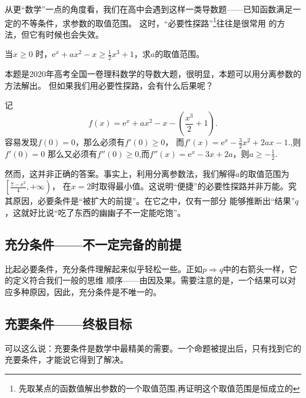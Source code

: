 从更“数学”一点的角度看，我们在高中会遇到这样一类导数题——已知函数满足一定的不等条件，求参数的取值范围。
这时，“必要性探路”\footnote{先取某点的函数值解出参数的一个取值范围,再证明这个取值范围是恒成立的}往往是很常用
的方法，但它有时候也会失效。
\begin{example}
    当$x \geqslant 0$ 时，$\mathrm{e}^x+ax^2 -x \geqslant \frac{1}{2}x^3 +1$，求$a$的取值范围。
\end{example}
\begin{solve}
    本题是2020年高考全国一卷理科数学的导数大题，很明显，本题可以用分离参数的方法解出。
    但如果我们用必要性探路，会有什么后果呢？

    记
    \[
        f(x)=\mathrm{e}^x+ax^2 -x-\left (\frac{x^3}{2} +1\right )
        .\]
    容易发现$f(0)=0$，那么必须有$f'(0)\geqslant 0$，
    而$f'(x)=\mathrm e^x-\frac{3}{2}x^2+2ax-1.$,则
    $f'(0)=0$ 那么又必须有$f''(0)\geqslant 0$,而$f''(x)=\mathrm e^x-3x+2a$，则$a\geqslant -\frac{1}{2}$.

\end{solve}

然而，这并非正确的答案。事实上，利用分离参数法，我们解得$a$的取值范围为$\left [ \frac{7-\mathrm e^2}{4},+\infty  \right ) $，
在$x=2$时取得最小值。这说明“便捷”的必要性探路并非万能。究其原因，必要条件是“被扩大的前提”。在它之中，仅有一部分
能够推断出“结果”$q$，这就好比说“吃了东西的幽幽子不一定能吃饱”。

\subsection{充分条件——不一定完备的前提}
比起必要条件，充分条件理解起来似乎轻松一些。正如$p\Rightarrow q$中的右箭头一样，它的定义符合我们一般的思维
顺序——由因及果。需要注意的是，一个结果可以对应多种原因，因此，充分条件是不唯一的。

\subsection{充要条件——终极目标}
可以这么说：充要条件是数学中最精美的需要。一个命题被提出后，只有找到它的充要条件，才能说它得到了解决。


